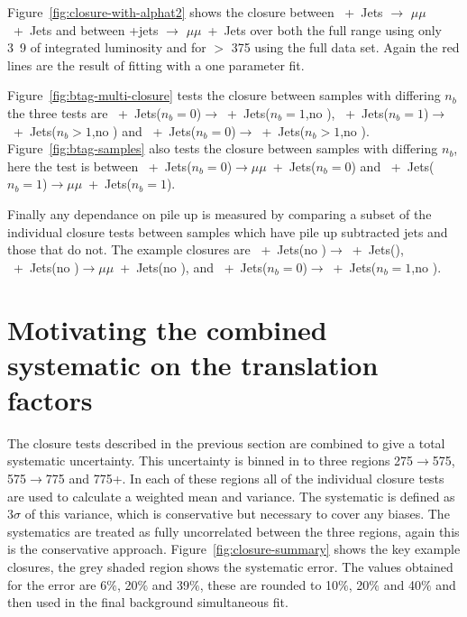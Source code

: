 Figure~\ref{fig:closure-with-alphat2} shows the closure between \Pmu~+~Jets 
$\rightarrow$ $\mu\mu$~+~Jets and between \Pphoton+jets $\rightarrow$ $\mu\mu$~+~Jets over both the 
full \HT range using only \unit{3.9}{\invfb} of integrated luminosity and for 
\HT $>$ \unit{375}{\GeV} using the full data set. Again the red lines are the 
result of fitting with a one parameter fit.

Figure~\ref{fig:btag-multi-closure} tests the closure between samples with 
differing $n_{b}$ the three tests are \Pmu~+~Jets($n_b = 0$)$\rightarrow$\Pmu~+~Jets($n_b = 
1$,no \alt), \Pmu~+~Jets($n_b = 1$)$\rightarrow$\Pmu~+~Jets($n_b > 1$,no \alt) and \Pmu~+~Jets($n_b = 
0$)$\rightarrow$\Pmu~+~Jets($n_b > 1$,no \alt). Figure~\ref{fig:btag-samples} also 
tests the closure between samples with differing $n_{b}$, here the test is 
between \Pmu~+~Jets($n_b = 0$)$\rightarrow$$\mu\mu$~+~Jets($n_b = 0$) and \Pmu~+~Jets($n_b =  
1$)$\rightarrow$$\mu\mu$~+~Jets($n_b = 1$).

Finally any dependance on pile up is measured by comparing a subset of the 
individual closure tests between samples which have pile up subtracted jets and 
those that do not. The example closures are \Pmu~+~Jets(no \alt)$\rightarrow$\Pmu~+~Jets(\altg),
\Pmu~+~Jets(no \alt)$\rightarrow$$\mu\mu$~+~Jets(no \alt), and \Pmu~+~Jets($n_b = 0$)$\rightarrow$\Pmu~+~Jets($n_b 
= 1$,no \alt).

\section{Motivating the combined systematic on the translation factors}
\label{sub:motivating_the_combined_systematic_on_the_translation_factors}
The closure tests described in the previous section are combined to give a 
total systematic uncertainty. This uncertainty is binned in to three \HT 
regions \unit{275}{\GeV}$\rightarrow$\unit{575}{\GeV}, 
\unit{575}{\GeV}$\rightarrow$\unit{775}{\GeV} and \unit{775}{\GeV}+. In each of 
these regions all of the individual closure tests are used to calculate a 
weighted mean and variance. The systematic is defined as $3\sigma$ of this 
variance, which is conservative but necessary to cover any biases. The 
systematics are treated as fully uncorrelated between the three regions, again 
this is the conservative approach. Figure~\ref{fig:closure-summary} shows the 
key example closures, the grey shaded region shows the systematic error. The 
values obtained for the error are 6$\%$, 20$\%$ and 39$\%$, these are rounded 
to 10$\%$, 20$\%$ and 40$\%$ and then used in the final background simultaneous 
fit.

